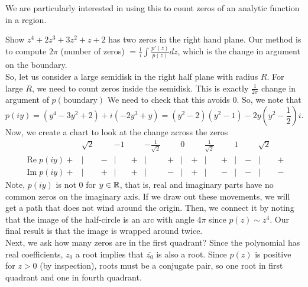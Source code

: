 \documentclass[11pt,leqno,oneside]{amsart}
\renewcommand{\Re}{\operatorname{Re}}
\renewcommand{\Im}{\operatorname{Im}}
\begin{document}
  We are particularly interested in using this to count zeros of an
  analytic function in a region.
  \begin{example}
    Show $z^4+2z^3+3z^2+z+2$ has two zeros in the right hand
    plane. Our method is to compute $2\pi$ (number of zeros) $=
    \frac{1}{i} \int \frac{p'(z)}{p(z)}dz$, which is the change in
    argument on the boundary. \\

    So, let us consider a large semidisk in the right half plane with
    radius $R$. For large $R$, we need to count zeros inside the
    semidisk. This is exactly $\frac{1}{2\pi}$ change in argument of
    $p(\text{boundary})$ We need to check that this avoids 0. So, we
    note that \[
      p(iy) = (y^4-3y^2+2) + i(-2y^3+y) = (y^2-2)(y^2-1) -
      2y(y^2-\frac{1}{2})i.
    \]
    Now, we create a chart to look at the change across the zeros 
    \[    
    \begin{array}{ccccccccccccccc}
      &\sqrt{2}&&-1&&-\frac{1}{\sqrt{2}}&&0&&\frac{1}{\sqrt{2}}&&1&&\sqrt{2}&
      \\
      \Re p(iy) + &|& - &|& + &|& + &|& + &|& + &|& - &|& + \\
      \Im p(iy) + &|& + &|& + &|& - &|& + &|& - &|& - &|& -
    \end{array}
    \]
    Note, $p(iy)$ is not 0 for $y \in {\mathbb R}$, that is, real and imaginary
    parts have no common zeros on the imaginary axis. If we draw out
    these movements, we will get a path that does not wind around the
    origin. Then, we connect it by noting that the image of the
    half-circle is an arc with angle $4\pi$ since $p(z) \sim z^4$. Our
    final result is that the image is wrapped around twice. \\

    Next, we ask how many zeros are in the first quadrant? Since the
    polynomial has real coefficients, $z_0$ a root implies that
    $\overline{z_0}$ is also a root. Since $p(z)$ is positive for $z >
    0$ (by inspection), roots must be a conjugate pair, so one root in
    first quadrant and one in fourth quadrant. 
  \end{example}
\end{document}

